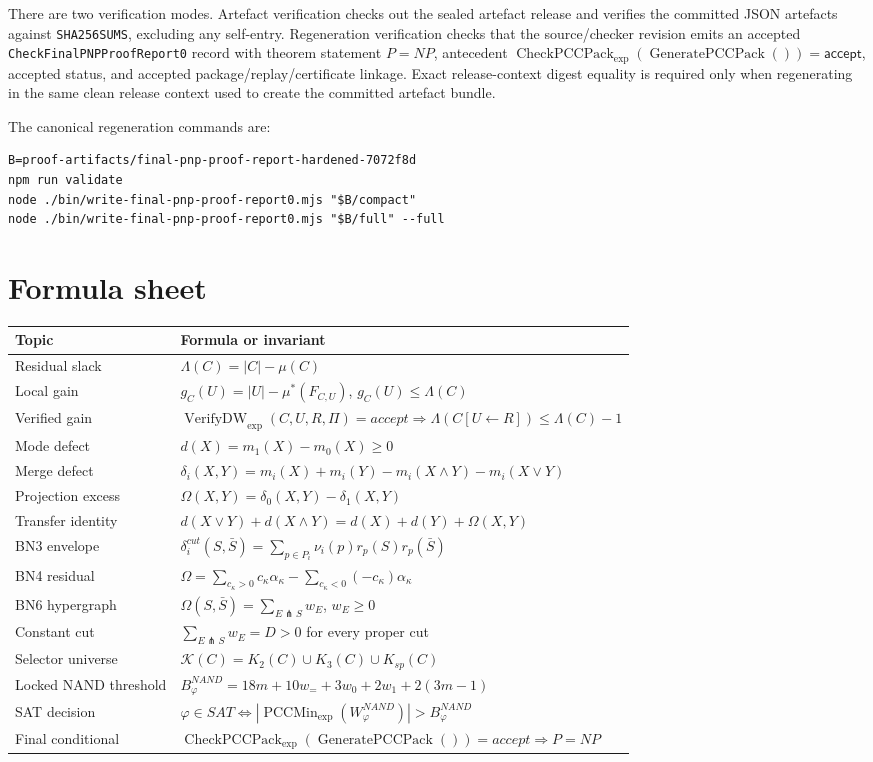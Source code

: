 \documentclass[10.5pt,a4paper]{article}
\newcommand{\VerifyDW}{\operatorname{VerifyDW}_{\exp}}
\newcommand{\PCCMin}{\operatorname{PCCMin}_{\exp}}
\newcommand{\CheckPack}{\operatorname{CheckPCCPack}_{\exp}}
\newcommand{\GenPack}{\operatorname{GeneratePCCPack}}
\newcommand{\cut}{\pitchfork}
\begin{document}
There are two verification modes.  Artefact verification checks out the sealed artefact release and verifies the committed JSON artefacts against \texttt{SHA256SUMS}, excluding any self-entry.  Regeneration verification checks that the source/checker revision emits an accepted \texttt{CheckFinalPNPProofReport0} record with theorem statement \(P=NP\), antecedent \(\CheckPack(\GenPack())=\mathsf{accept}\), accepted status, and accepted package/replay/certificate linkage.  Exact release-context digest equality is required only when regenerating in the same clean release context used to create the committed artefact bundle.

The canonical regeneration commands are:
\begin{lstlisting}
B=proof-artifacts/final-pnp-proof-report-hardened-7072f8d
npm run validate
node ./bin/write-final-pnp-proof-report0.mjs "$B/compact"
node ./bin/write-final-pnp-proof-report0.mjs "$B/full" --full
\end{lstlisting}

\section{Formula sheet}
\begin{longtable}{>{\raggedright\arraybackslash}p{}p{}}
\toprule
Topic & Formula or invariant\\
\midrule
Residual slack & \(\Lambda(C)=|C|-\mu(C)\)\\
Local gain & \(g_C(U)=|U|-\mu^*(F_{C,U})\), \(g_C(U)\le\Lambda(C)\)\\
Verified gain & \(\VerifyDW(C,U,R,\Pi)=accept\Rightarrow\Lambda(C[U\leftarrow R])\le\Lambda(C)-1\)\\
Mode defect & \(d(X)=m_1(X)-m_0(X)\ge0\)\\
Merge defect & \(\delta_i(X,Y)=m_i(X)+m_i(Y)-m_i(X\wedge Y)-m_i(X\vee Y)\)\\
Projection excess & \(\Omega(X,Y)=\delta_0(X,Y)-\delta_1(X,Y)\)\\
Transfer identity & \(d(X\vee Y)+d(X\wedge Y)=d(X)+d(Y)+\Omega(X,Y)\)\\
BN3 envelope & \(\delta_i^{cut}(S,\bar S)=\sum_{p\in P_i}\nu_i(p)r_p(S)r_p(\bar S)\)\\
BN4 residual & \(\Omega=\sum_{c_\kappa>0}c_\kappa\alpha_\kappa-\sum_{c_\kappa<0}(-c_\kappa)\alpha_\kappa\)\\
BN6 hypergraph & \(\Omega(S,\bar S)=\sum_{E\cut S}w_E\), \(w_E\ge0\)\\
Constant cut & \(\sum_{E\cut S}w_E=D>0\) for every proper cut\\
Selector universe & \(\mathcal K(C)=K_2(C)\cup K_3(C)\cup K_{sp}(C)\)\\
Locked NAND threshold & \(B^{NAND}_\varphi=18m+10w_=+3w_0+2w_1+2(3m-1)\)\\
SAT decision & \(\varphi\in SAT\Longleftrightarrow |\PCCMin(W^{NAND}_\varphi)|>B^{NAND}_\varphi\)\\
Final conditional & \(\CheckPack(\GenPack())=accept\Rightarrow P=NP\)\\
\bottomrule
\end{longtable}
\end{document}
